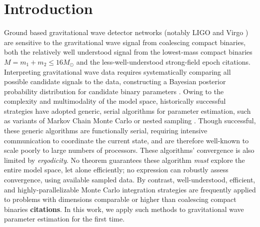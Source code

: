 \documentclass[twocolumn,prd,nofootinbib]{revtex4}
\newcommand\editremark[1]{{\color{red} #1}}
\newcommand\citeMCMC{\cite{LIGO-CBC-S6-PE,2011PhRvD..83h2002D,2011PhRvD..84f2003C,gr-extensions-tests-Europeans2011,gwastro-mergers-PE-Aylott-LIGOATest,2011ApJ...739...99N,2012PhRvD..85j4045V,gw-astro-PE-Raymond,gw-astro-PE-lalinference-v1}}
\begin{document}
\section{Introduction}

Ground based gravitational wave detector networks (notably LIGO \cite{gw-detectors-LIGO-original-preferred} and Virgo
\cite{gw-detectors-VIRGO-original-preferred})  are sensitive to the gravitational wave signal from coalescing compact
binaries, both the relatively well understood signal from  the lowest-mass compact binaries
$M=m_1+m_2\le 16 M_\odot$
\cite{2003PhRvD..67j4025B,2004PhRvD..70j4003B,2004PhRvD..70f4028D,BCV:PTF,2005PhRvD..71b4039K,2005PhRvD..72h4027B,2006PhRvD..73l4012K,2007MNRAS.374..721T,2008PhRvD..78j4007H,gr-astro-eccentric-NR-2008,gw-astro-mergers-approximations-SpinningPNHigherHarmonics,gw-astro-PN-Comparison-AlessandraSathya2009}
and the less-well-understood strong-field epoch \editremark{citations}.    
%
Interpreting gravitational wave data requires systematically comparing all possible candidate signals to the data,
constructing a Bayesian posterior probability distribution for candidate binary parameters \citeMCMC{}.   
%
Owing to the complexity and multimodality of the model space, historically successful strategies have adopted  generic, serial
algorithms for parameter estimation, such as variants of Markov Chain Monte Carlo or nested sampling
\cite{2011RvMP...83..943V,gw-astro-PE-lalinference-v1}.  
Though successful, these generic algorithms are functionally serial, requiring intensive communication to coordinate the
current state, and are therefore well-known to scale poorly to large numbers of processors.  
%
These algorithms' convergence is also limited by \emph{ergodicity}.  No theorem guarantees these algorithm \emph{must}
 explore the entire model space, let alone efficiently; no expression can robustly assess convergence, using available
 sampled data.  
%
By contrast, well-understood, efficient, and highly-parallelizable Monte Carlo integration strategies are frequently applied to problems with dimensions comparable or
higher than coalescing compact binaries \textbf{citations}.    In this work, we apply such methods to gravitational wave
parameter estimation for the first time.  
%
\end{document}
